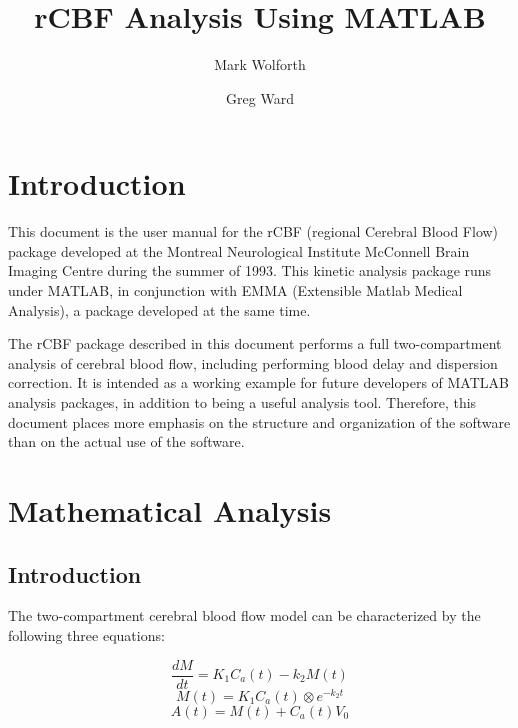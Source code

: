 
\title{rCBF Analysis Using MATLAB}
\author{Mark Wolforth \and Greg Ward}

\def\code#1{{\tt #1}}



\maketitle
\newpage

\tableofcontents

\newpage
\section{Introduction}

This document is the user manual for the rCBF (regional Cerebral
Blood Flow) package developed at the Montreal Neurological Institute
McConnell Brain Imaging Centre during the summer of 1993.  This
kinetic analysis package runs under MATLAB, in conjunction with EMMA
(Extensible Matlab Medical Analysis), a package developed at the same
time.

The rCBF package described in this document performs a full
two-compartment analysis of cerebral blood flow, including performing
blood delay and dispersion correction.  It is intended as a working
example for future developers of MATLAB analysis packages, in
addition to being a useful analysis tool.  Therefore, this document
places more emphasis on the structure and organization of the
software than on the actual use of the software.

\newpage
\section{Mathematical Analysis}

\subsection{Introduction}

The two-compartment cerebral blood flow model can be characterized by
the following three equations:

\begin{equation}
\frac{dM}{dt} = K_{1}C_{a}(t) - k_{2}M(t)      \label{eq:2comp1}
\end{equation}
\begin{equation}
M(t) = K_{1}C_{a}(t) \otimes e^{-k_{2}t}       \label{eq:2comp2}
\end{equation}
\begin{equation}
A(t) = M(t) + C_{a}(t)V_{0}                    \label{eq:2comp3}
\end{equation}

